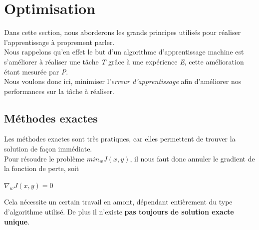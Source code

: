 \documentclass[10pt,a4paper]{report}
\begin{document}
	\section{Optimisation}
	Dans cette section, nous aborderons les grands principes utilisés pour réaliser l'apprentissage à proprement parler.\\
	Nous rappelons qu'en effet le but d'un algorithme d'apprentissage machine est s'améliorer à réaliser une tâche \emph{T} grâce à une expérience \emph{E}, cette amélioration étant mesurée par \emph{P}.\\
	Nous voulons donc ici, minimiser l'\emph{erreur d'apprentissage} afin d'améliorer nos performances sur la tâche à réaliser.\\
		\subsection{Méthodes exactes}
		Les méthodes exactes sont très pratiques, car elles permettent de trouver la solution de façon immédiate.\\
		Pour résoudre le problème $min_{w}J(x,y)$, il nous faut donc annuler le gradient de la fonction de perte, soit
		\begin{center}
			$\nabla_{w} J(x,y) = 0$
		\end{center}
		Cela nécessite un certain travail en amont, dépendant entièrement du type d'algorithme utilisé.
		De plus il n'existe \textbf{pas toujours de solution exacte unique}.
\end{document}
